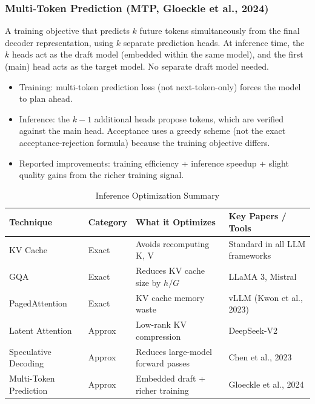 \documentclass[11pt, a4paper]{article}
\begin{document}
\subsubsection{Multi-Token Prediction (MTP, Gloeckle et al., 2024)}

\begin{defbox}
A training objective that predicts $k$ future tokens simultaneously from the final decoder representation, using $k$ separate prediction heads. At inference time, the $k$ heads act as the draft model (embedded within the same model), and the first (main) head acts as the target model. No separate draft model needed.
\end{defbox}

\begin{itemize}[leftmargin=2em]
  \item Training: multi-token prediction loss (not next-token-only) forces the model to plan ahead.
  \item Inference: the $k-1$ additional heads propose tokens, which are verified against the main head. Acceptance uses a greedy scheme (not the exact acceptance-rejection formula) because the training objective differs.
  \item Reported improvements: training efficiency + inference speedup + slight quality gains from the richer training signal.
\end{itemize}

\begin{table}[h]
\centering
\caption{Inference Optimization Summary}
\begin{tabular}{@{}p{3.5cm}p{2cm}p{4cm}p{3.5cm}@{}}
\toprule
\textbf{Technique} & \textbf{Category} & \textbf{What it Optimizes} & \textbf{Key Papers / Tools} \\
\midrule
KV Cache & Exact & Avoids recomputing K, V & Standard in all LLM frameworks \\
GQA & Exact & Reduces KV cache size by $h/G$ & LLaMA 3, Mistral \\
PagedAttention & Exact & KV cache memory waste & vLLM (Kwon et al., 2023) \\
Latent Attention & Approx & Low-rank KV compression & DeepSeek-V2 \\
Speculative Decoding & Approx & Reduces large-model forward passes & Chen et al., 2023 \\
Multi-Token Prediction & Approx & Embedded draft + richer training & Gloeckle et al., 2024 \\
\bottomrule
\end{tabular}
\end{table}
\end{document}

